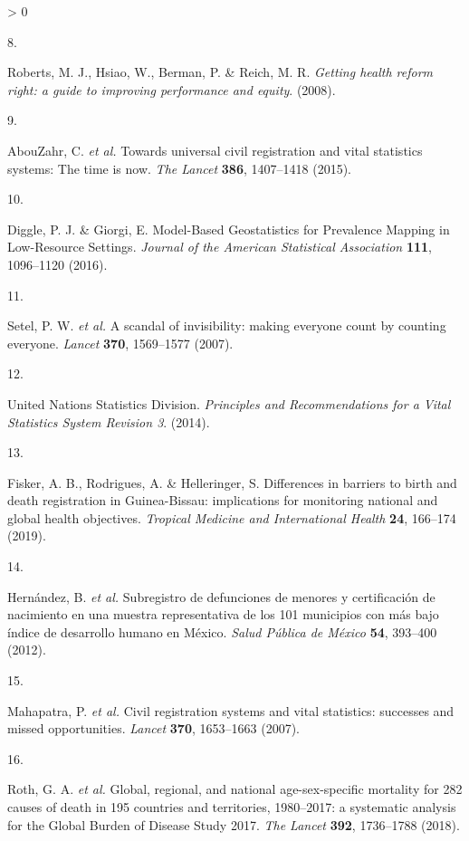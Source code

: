 \documentclass[
]{article}
\newlength{\cslhangindent}
\newlength{\csllabelwidth}
\newenvironment{CSLReferences}[2] %
 {%
  \setlength{\parindent}{0pt}
  \ifodd #1 \everypar{\setlength{\hangindent}{\cslhangindent}}\ignorespaces\fi
  \ifnum #2 > 0
  \setlength{\parskip}{#2\baselineskip}
  \fi
 }%
 {}
\newcommand{\CSLLeftMargin}[1]{\parbox[t]{\csllabelwidth}{#1}}
\newcommand{\CSLRightInline}[1]{\parbox[t]{\linewidth - \csllabelwidth}{#1}\break}
\begin{document}
\begin{CSLReferences}{0}{0}
\leavevmode\hypertarget{ref-Roberts2008}{}%
\CSLLeftMargin{8. }
\CSLRightInline{Roberts, M. J., Hsiao, W., Berman, P. \& Reich, M. R. \emph{{Getting health reform right: a guide to improving performance and equity}}. (2008).}

\leavevmode\hypertarget{ref-AbouZahr2015}{}%
\CSLLeftMargin{9. }
\CSLRightInline{AbouZahr, C. \emph{et al.} {Towards universal civil registration and vital statistics systems: The time is now}. \emph{The Lancet} \textbf{386}, 1407--1418 (2015).}

\leavevmode\hypertarget{ref-Diggle2016}{}%
\CSLLeftMargin{10. }
\CSLRightInline{Diggle, P. J. \& Giorgi, E. {Model-Based Geostatistics for Prevalence Mapping in Low-Resource Settings}. \emph{Journal of the American Statistical Association} \textbf{111}, 1096--1120 (2016).}

\leavevmode\hypertarget{ref-Setel2007}{}%
\CSLLeftMargin{11. }
\CSLRightInline{Setel, P. W. \emph{et al.} {A scandal of invisibility: making everyone count by counting everyone}. \emph{Lancet} \textbf{370}, 1569--1577 (2007).}

\leavevmode\hypertarget{ref-UnitedNationsStatisticsDivision2014}{}%
\CSLLeftMargin{12. }
\CSLRightInline{United Nations Statistics Division. \emph{{Principles and Recommendations for a Vital Statistics System Revision 3}}. (2014).}

\leavevmode\hypertarget{ref-Fisker2019}{}%
\CSLLeftMargin{13. }
\CSLRightInline{Fisker, A. B., Rodrigues, A. \& Helleringer, S. {Differences in barriers to birth and death registration in Guinea-Bissau: implications for monitoring national and global health objectives}. \emph{Tropical Medicine and International Health} \textbf{24}, 166--174 (2019).}

\leavevmode\hypertarget{ref-Hernandez2012}{}%
\CSLLeftMargin{14. }
\CSLRightInline{Hernández, B. \emph{et al.} {Subregistro de defunciones de menores y certificaci{ó}n de nacimiento en una muestra representativa de los 101 municipios con m{á}s bajo {í}ndice de desarrollo humano en M{é}xico}. \emph{Salud P{ú}blica de M{é}xico} \textbf{54}, 393--400 (2012).}

\leavevmode\hypertarget{ref-Mahapatra2007}{}%
\CSLLeftMargin{15. }
\CSLRightInline{Mahapatra, P. \emph{et al.} {Civil registration systems and vital statistics: successes and missed opportunities}. \emph{Lancet} \textbf{370}, 1653--1663 (2007).}

\leavevmode\hypertarget{ref-Roth2018}{}%
\CSLLeftMargin{16. }
\CSLRightInline{Roth, G. A. \emph{et al.} {Global, regional, and national age-sex-specific mortality for 282 causes of death in 195 countries and territories, 1980--2017: a systematic analysis for the Global Burden of Disease Study 2017}. \emph{The Lancet} \textbf{392}, 1736--1788 (2018).}


\end{CSLReferences}
\end{document}
